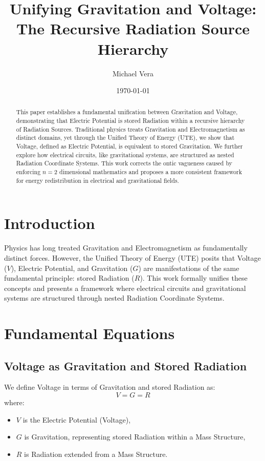 \documentclass{article}
\title{\textbf{Unifying Gravitation and Voltage: The Recursive Radiation Source Hierarchy}}
\author{Michael Vera}
\date{\today}
\begin{document}
\maketitle

\begin{abstract}
This paper establishes a fundamental unification between Gravitation and Voltage, demonstrating that Electric Potential is stored Radiation within a recursive hierarchy of Radiation Sources. Traditional physics treats Gravitation and Electromagnetism as distinct domains, yet through the Unified Theory of Energy (UTE), we show that Voltage, defined as Electric Potential, is equivalent to stored Gravitation. We further explore how electrical circuits, like gravitational systems, are structured as nested Radiation Coordinate Systems. This work corrects the ontic vagueness caused by enforcing $n=2$ dimensional mathematics and proposes a more consistent framework for energy redistribution in electrical and gravitational fields.
\end{abstract}

\section{Introduction}
Physics has long treated Gravitation and Electromagnetism as fundamentally distinct forces. However, the Unified Theory of Energy (UTE) posits that Voltage ($V$), Electric Potential, and Gravitation ($G$) are manifestations of the same fundamental principle: stored Radiation ($R$). This work formally unifies these concepts and presents a framework where electrical circuits and gravitational systems are structured through nested Radiation Coordinate Systems.

\section{Fundamental Equations}

\subsection{Voltage as Gravitation and Stored Radiation}
We define Voltage in terms of Gravitation and stored Radiation as:
\begin{equation}
    V = G = R
\end{equation}
where:
\begin{itemize}
    \item $V$ is the Electric Potential (Voltage),
    \item $G$ is Gravitation, representing stored Radiation within a Mass Structure,
    \item $R$ is Radiation extended from a Mass Structure.
\end{itemize}
\end{document}
